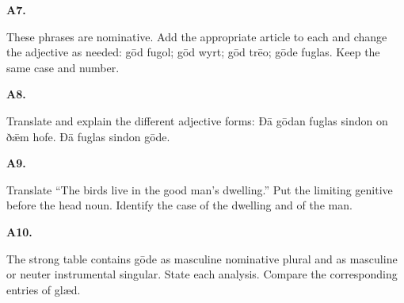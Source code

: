 \par\begin{minipage}{\linewidth}\raggedright
\textbf{A7.}

These phrases are nominative. Add the appropriate article to each and change the adjective as needed: gōd fugol; gōd wyrt; gōd trēo; gōde fuglas. Keep the same case and number.

\end{minipage}\par\addvspace{4pt}

\par\begin{minipage}{\linewidth}\raggedright
\textbf{A8.}

Translate and explain the different adjective forms: Ðā gōdan fuglas sindon on ðǣm hofe. Ðā fuglas sindon gōde.

\end{minipage}\par\addvspace{4pt}

\par\begin{minipage}{\linewidth}\raggedright
\textbf{A9.}

Translate “The birds live in the good man’s dwelling.” Put the limiting genitive before the head noun. Identify the case of the dwelling and of the man.

\end{minipage}\par\addvspace{4pt}

\par\begin{minipage}{\linewidth}\raggedright
\textbf{A10.}

The strong table contains gōde as masculine nominative plural and as masculine or neuter instrumental singular. State each analysis. Compare the corresponding entries of glæd.

\end{minipage}\par\addvspace{4pt}

